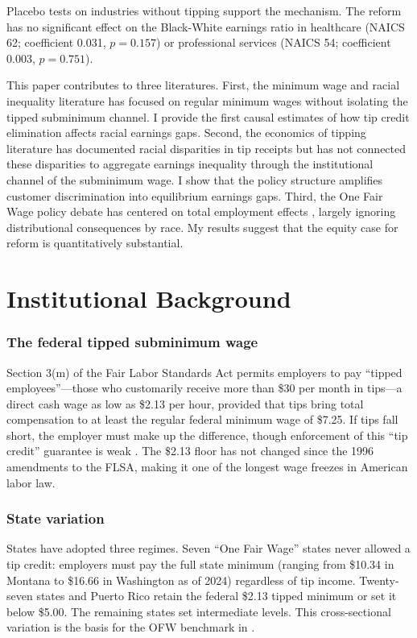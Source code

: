 \documentclass[12pt]{article}
\begin{document}
Placebo tests on industries without tipping support the mechanism. The reform has no significant effect on the Black-White earnings ratio in healthcare (NAICS 62; coefficient 0.031, $p = 0.157$) or professional services (NAICS 54; coefficient 0.003, $p = 0.751$).

This paper contributes to three literatures. First, the minimum wage and racial inequality literature has focused on regular minimum wages \citep{derenoncourt2021minimum, wursten2023minimum} without isolating the tipped subminimum channel. I provide the first causal estimates of how tip credit elimination affects racial earnings gaps. Second, the economics of tipping literature has documented racial disparities in tip receipts \citep{lynn2008tipping, brewster2012race} but has not connected these disparities to aggregate earnings inequality through the institutional channel of the subminimum wage. I show that the policy structure amplifies customer discrimination into equilibrium earnings gaps. Third, the One Fair Wage policy debate has centered on total employment effects \citep{allegretto2018serving, even2014tipped}, largely ignoring distributional consequences by race. My results suggest that the equity case for reform is quantitatively substantial.

\section{Institutional Background}

\subsubsection*{The federal tipped subminimum wage} Section 3(m) of the Fair Labor Standards Act permits employers to pay ``tipped employees''---those who customarily receive more than \$30 per month in tips---a direct cash wage as low as \$2.13 per hour, provided that tips bring total compensation to at least the regular federal minimum wage of \$7.25. If tips fall short, the employer must make up the difference, though enforcement of this ``tip credit'' guarantee is weak \citep{bernhardt2009broken}. The \$2.13 floor has not changed since the 1996 amendments to the FLSA, making it one of the longest wage freezes in American labor law.

\subsubsection*{State variation} States have adopted three regimes. Seven ``One Fair Wage'' states never allowed a tip credit: employers must pay the full state minimum (ranging from \$10.34 in Montana to \$16.66 in Washington as of 2024) regardless of tip income. Twenty-seven states and Puerto Rico retain the federal \$2.13 tipped minimum or set it below \$5.00. The remaining states set intermediate levels. This cross-sectional variation is the basis for the OFW benchmark in .
\end{document}
